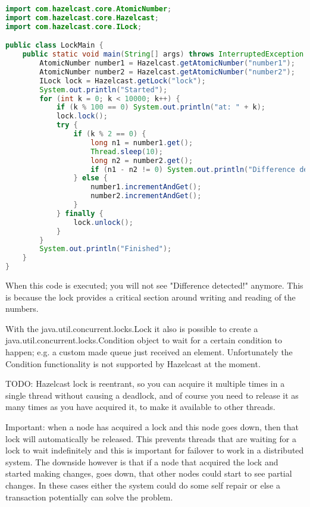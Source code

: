 \begin{lstlisting}[language=java]
import com.hazelcast.core.AtomicNumber;
import com.hazelcast.core.Hazelcast;
import com.hazelcast.core.ILock;

public class LockMain {
    public static void main(String[] args) throws InterruptedException {
        AtomicNumber number1 = Hazelcast.getAtomicNumber("number1");
        AtomicNumber number2 = Hazelcast.getAtomicNumber("number2");
        ILock lock = Hazelcast.getLock("lock");
        System.out.println("Started");
        for (int k = 0; k < 10000; k++) {
            if (k % 100 == 0) System.out.println("at: " + k);
            lock.lock();
            try {
                if (k % 2 == 0) {
                    long n1 = number1.get();
                    Thread.sleep(10);
                    long n2 = number2.get();
                    if (n1 - n2 != 0) System.out.println("Difference detected!");
                } else {
                    number1.incrementAndGet();
                    number2.incrementAndGet();
                }
            } finally {
                lock.unlock();
            }
        }
        System.out.println("Finished");
    }
}
\end{lstlisting}

When this code is executed; you will not see "Difference detected!" anymore. This is because the lock provides a critical section around writing and reading of the numbers. 

With the java.util.concurrent.locks.Lock it also is possible to create a java.util.concurrent.locks.Condition object to wait for a certain condition to happen; e.g. a custom made queue just received an element. Unfortunately the Condition functionality is not supported by Hazelcast at the moment.

TODO: Hazelcast lock is reentrant, so you can acquire it multiple times in a single thread without causing a deadlock, and of course you need to release it as many times as you have acquired it, to make it available to other threads.

Important: when a node has acquired a lock and this node goes down, then that lock will automatically be released. This prevents threads that are waiting for a lock to wait indefinitely and this is important for failover to work in a distributed system. The downside however is that if a node that acquired the lock and started making changes, goes down, that other nodes could start to see partial changes. In these cases either the system could do some self repair or else a transaction potentially can solve the problem.


